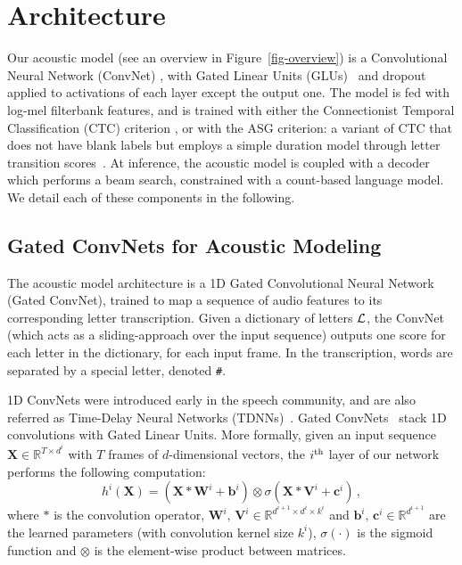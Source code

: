 \documentclass{article}
\def\R{\mathbb{R}}
\begin{document}
\section{Architecture}

Our acoustic model (see an overview in Figure~\ref{fig-overview}) is a
Convolutional Neural Network (ConvNet) \citep{lecun1995convolutional}, with
Gated Linear Units (GLUs)~\citep{dauphin2017lm} and dropout applied to activations
of each layer except the output one. The model is fed with
log-mel filterbank features, and is trained with either the Connectionist
Temporal Classification (CTC) criterion \citep{graves2006connectionist}, or with the ASG criterion: a variant of CTC that does not have blank labels but employs a simple duration model through letter transition scores~\citep{collobert2016wav2letter}. At inference, the acoustic model is coupled
with a decoder which performs a beam search, constrained with a count-based
language model. We detail each of these components in the following.

\subsection{Gated ConvNets for Acoustic Modeling}
\label{sec-glu}

The acoustic model architecture is a 1D Gated Convolutional Neural Network
(Gated ConvNet), trained to map a sequence of audio features to its
corresponding letter transcription. Given a dictionary of letters ${\cal
  L}$, the ConvNet (which acts as a sliding-approach over the input
sequence) outputs one score for each letter in the dictionary, for each
input frame. In the transcription, words are separated by a special letter,
denoted \texttt{\small \#}.


1D ConvNets were introduced early in the speech community, and are also
referred as Time-Delay Neural Networks
(TDNNs)~\citep{waibel1989tdnn}. Gated ConvNets~\citep{dauphin2017lm} stack
1D convolutions with Gated Linear Units. More formally, given an input
sequence $\mathbf{X} \in \R^{T\times d^i}$ with $T$ frames of
$d$-dimensional vectors, the $i^{\rm th}$ layer of our network performs the
following computation:
\begin{equation}
\label{eq-glu}
h^i(\mathbf{X}) = (\mathbf{X}\ast\mathbf{W}^i+\mathbf{b}^i)\otimes \sigma(\mathbf{X}\ast\mathbf{V}^i+\mathbf{c}^i)\,,
\end{equation}
where $\ast$ is the convolution operator, $\mathbf{W}^i,\, \mathbf{V}^i \in \R^{d^{i+1}\times d^i \times k^i}$ and $\mathbf{b}^i,\, \mathbf{c}^i \in \R^{d^{i+1}}$ are the
learned parameters (with convolution kernel size $k^i$), $\sigma(\cdot)$ is the sigmoid function and $\otimes$ is the element-wise product between matrices.
\end{document}
